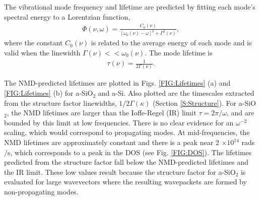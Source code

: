 \documentclass[aps,prb,onecolumn,preprint,superscriptaddress,footinbib,amsmath,amssymb,floatfix]{revtex4}
\begin{document}
The vibrational mode frequency and lifetime are predicted by fitting each mode's 
spectral energy to a Lorentzian function, 
\begin{equation}\label{EQ:Lorentzian_NMD}
\begin{split}
\Phi(\nu,\omega) = 
\frac{C_0(\nu)}{[\omega_0(\nu)-\omega]^2+\Gamma^2(\nu)},
\end{split}
\end{equation}
where the constant $C_0(\nu)$ is related to the average energy of 
each mode and is valid when the linewidth  
$\Gamma(\nu) << \omega_0(\nu)$.\cite{larkin_comparison_2012} 
The mode lifetime is\cite{ladd_lattice_1986,turney_predicting_2009-1} 
\begin{equation}\label{EQ:NMD_life}
\begin{split}
\tau(\nu) = \frac{1}{2\Gamma(\nu)}.
\end{split}
\end{equation}

The NMD-predicted lifetimes are plotted in Figs. \ref{FIG:Lifetimes} 
(a) and \ref{FIG:Lifetimes} (b) 
for a-SiO$_2$ and a-Si. 
Also plotted are the timescales extracted from the structure 
factor linewidths, $1/2\Gamma(\kappa)$ (Section \ref{S:Structure}). 
For a-SiO$_2$, the NMD lifetimes are larger than 
the Ioffe-Regel (IR) limit $\tau = 2\pi/\omega$,
\cite{taraskin_determination_1999} and are bounded by  
this limit at low frequencies. There is no clear evidence for an 
$\omega^{-2}$ scaling, which would correspond to propagating modes.  
At mid-frequencies, the NMD lifetimes are approximately constant and  
there is a peak near 2 $\times 10^{14}$ rads$/$s, which corresponds to 
a peak in the DOS (see Fig. \ref{FIG:DOS}). 
The lifetimes predicted from the 
structure factor fall below the NMD-predicted lifetimes 
and the IR limit. These low values result because the structure factor 
for a-SiO$_2$ is evaluated for large wavevectors where the resulting 
wavepackets are formed by non-propagating modes.
\cite{feldman_thermal_1993,feldman_numerical_1999,allen_diffusons_1999}
\end{document}
